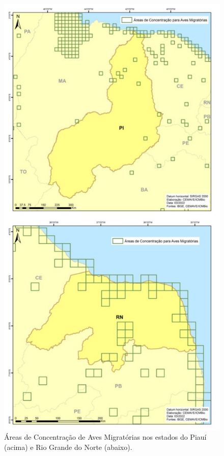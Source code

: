 \documentclass[
  oneside]{scrbook}
\begin{document}
\begin{figure}[H]

{\centering \includegraphics[width=0.7\linewidth]{imagens/cap07/Fig_14_PI_RN} 

}

\caption{Áreas de Concentração de Aves Migratórias nos estados do Piauí (acima) e Rio Grande do Norte (abaixo).}\label{fig:34}
\end{figure}
\end{document}
